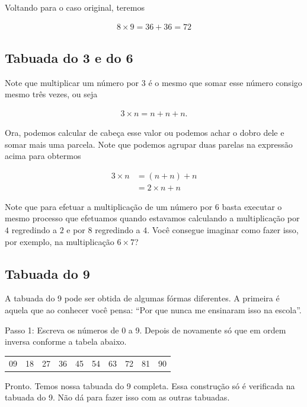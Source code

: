 Voltando para o caso original, teremos

\begin{align*}
    8\times9=36+36=72
\end{align*}

\subsection{Tabuada do 3 e do 6}

Note que multiplicar um número por $3$ é o mesmo que somar esse número consigo mesmo três vezes, ou seja

\begin{align*}
    3\times n=n+n+n.
\end{align*}

Ora, podemos calcular de cabeça esse valor ou podemos achar o dobro dele e somar mais uma parcela. Note que podemos agrupar duas parelas na expressão acima para obtermos

\begin{align*}
    3\times n&=(n+n)+n\\
    &=2\times n+n
\end{align*}

Note que para efetuar a multiplicação de um número por $6$ basta executar o mesmo processo que efetuamos quando estavamos calculando a multiplicação por $4$ regredindo a $2$ e por $8$ regredindo a $4$. Você consegue imaginar como fazer isso, por exemplo, na multiplicação $6\times 7$?

\subsection{Tabuada do 9}

A tabuada do 9 pode ser obtida de algumas fórmas diferentes. A primeira é aquela que ao conhecer você pensa: ``Por que nunca me ensinaram isso na escola''. 

Passo 1: Escreva os números de 0 a 9. Depois de novamente só que em ordem inversa conforme a tabela abaixo.

\begin{center}
\begin{tabular}{c|c|c|c|c|c|c|c|c|c}
09 & 18 & 27 & 36 & 45 & 54 & 63 & 72 & 81 & 90 \\
\end{tabular}
\end{center}


Pronto. Temos nossa tabuada do 9 completa. Essa construção só é verificada na tabuada do 9. Não dá para fazer isso com as outras tabuadas.

